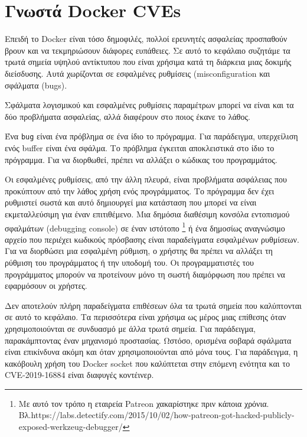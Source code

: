 \chapter{Γνωστά \textlatin{Docker CVEs}}
\label{knownDockerCves}

Επειδή το \textlatin{Docker} είναι τόσο δημοφιλές, πολλοί ερευνητές ασφαλείας
προσπαθούν βρουν και να τεκμηριώσουν διάφορες ευπάθειες. Σε αυτό το κεφάλαιο
συζητάμε τα τρωτά σημεία υψηλού αντίκτυπου που είναι χρήσιμα κατά τη διάρκεια
μιας δοκιμής διείσδυσης. Αυτά χωρίζονται σε εσφαλμένες ρυθμίσεις
(\textlatin{misconfiguration} και σφάλματα (\textlatin{bugs}).

Σφάλματα λογισμικού και εσφαλμένες ρυθμίσεις παραμέτρων μπορεί να είναι και τα
δύο προβλήματα ασφαλείας, αλλά διαφέρουν στο ποιος έκανε το λάθος.

Ένα \texttt{\textlatin{bug}} είναι ένα πρόβλημα σε ένα ίδιο το πρόγραμμα. Για
παράδειγμα, υπερχείλιση ενός \textlatin{buffer} είναι ένα σφάλμα. Το πρόβλημα
έγκειται αποκλειστικά στο ίδιο το πρόγραμμα. Για να διορθωθεί, πρέπει να
αλλάξει ο κώδικας του προγραμμάτος.

Οι εσφαλμένες ρυθμίσεις, από την άλλη πλευρά, είναι προβλήματα ασφάλειας που
προκύπτουν από την λάθος χρήση ενός προγράμματος. Το πρόγραμμα δεν έχει
ρυθμιστεί σωστά και αυτό δημιουργεί μια κατάσταση που μπορεί να είναι
εκμεταλλεύσιμη για έναν επιτιθέμενο. Μια δημόσια διαθέσιμη κονσόλα εντοπισμού
σφαλμάτων (\textlatin{debugging console}) σε έναν ιστότοπο 
\footnote{Με αυτό τον τρόπο η εταιρεία \textlatin{Patreon} χακαρίστηκε πριν
κάποια χρόνια. Βλ.\textlatin{https://labs.detectify.com/2015/10/02/how-patreon-got-hacked-publicly-exposed-werkzeug-debugger/}}
ή ένα δημοσίως αναγνώσιμο αρχείο που περιέχει κωδικούς πρόσβασης είναι
παραδείγματα εσφαλμένων ρυθμίσεων. Για να διορθώσει μια εσφαλμένη
ρύθμιση, ο χρήστης θα πρέπει να αλλάξει τη ρύθμιση του προγράμματος ή την
υποδομή του. Οι προγραμματιστές του προγράμματος μπορούν να προτείνουν μόνο
τη σωστή διαμόρφωση που πρέπει να εφαρμόσουν οι χρήστες.

Δεν αποτελούν πλήρη παραδείγματα επιθέσεων όλα τα τρωτά σημεία που καλύπτονται
σε αυτό το κεφάλαιο. Τα περισσότερα είναι χρήσιμα ως μέρος μιας επίθεσης όταν
χρησιμοποιούνται σε συνδυασμό με άλλα τρωτά σημεία. Για παράδειγμα,
παρακάμπτοντας έναν μηχανισμό προστασίας. Ωστόσο, ορισμένα σοβαρά σφάλματα
είναι επικίνδυνα ακόμη και όταν χρησιμοποιούνται από μόνα τους.
Για παράδειγμα, η κακόβουλη χρήση του \textlatin{Docker socket} που καλύπτεται
στην επόμενη ενότητα και το \textlatin{CVE-2019-16884} είναι διαφυγές κοντέινερ.

